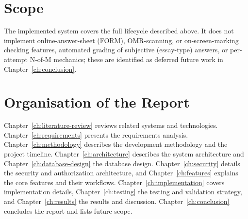 \section{Scope}

The implemented system covers the full lifecycle described above. It does not
implement online-answer-sheet (FORM), OMR-scanning, or on-screen-marking
checking features, automated grading of subjective (essay-type) answers, or
per-attempt N-of-M mechanics; these are identified as deferred future work in
Chapter~\ref{ch:conclusion}.

\section{Organisation of the Report}

\noindent Chapter~\ref{ch:literature-review} reviews related systems and
technologies. Chapter~\ref{ch:requirements} presents the requirements
analysis. Chapter~\ref{ch:methodology} describes the development methodology and
the project timeline. Chapter~\ref{ch:architecture} describes the system
architecture and Chapter~\ref{ch:database-design} the database design.
Chapter~\ref{ch:security} details the security and authorization architecture,
and Chapter~\ref{ch:features} explains the core features and their workflows.
Chapter~\ref{ch:implementation} covers implementation details,
Chapter~\ref{ch:testing} the testing and validation strategy, and
Chapter~\ref{ch:results} the results and discussion.
Chapter~\ref{ch:conclusion} concludes the report and lists future scope.